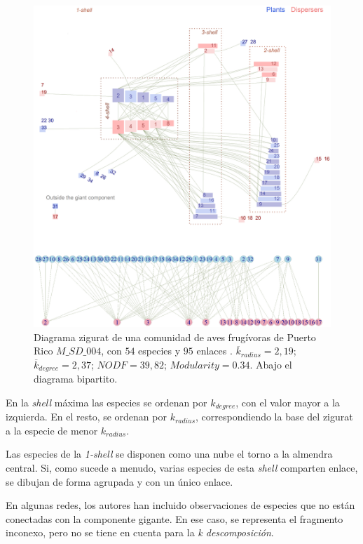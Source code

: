 \begin{figure}[h!]
\centering
\includegraphics[scale=0.45]{Figures/VIS_ALL_SD_004.eps}
\caption {Diagrama zigurat de una comunidad de aves frugívoras de Puerto Rico  $M\_SD\_004$, con $54$ especies y $95$ enlaces \cite{carlo2003avian}. $\overline k_{radius} = 2,19$; $\overline k_{degree} = 2,37$; $NODF = 39,82$; $Modularity = 0.34$. Abajo el diagrama bipartito.}
\label{fig:ziggurat}
\end{figure}

En la \textit{shell} máxima las especies se ordenan por $k_{degree}$, con el valor mayor a la izquierda. En el resto, se ordenan por $k_{radius}$, correspondiendo la base del zigurat a la especie de menor $k_{radius}$.

Las especies de la \textit{1-shell} se disponen como una nube el torno a la almendra central. Si, como sucede a menudo, varias especies de esta \textit{shell} comparten enlace, se dibujan de forma agrupada y con un único enlace.

En algunas redes, los autores han incluido observaciones de especies que no están conectadas con la componente gigante. En ese caso, se representa el fragmento inconexo, pero no se tiene en cuenta para la \textit{k descomposición}.

